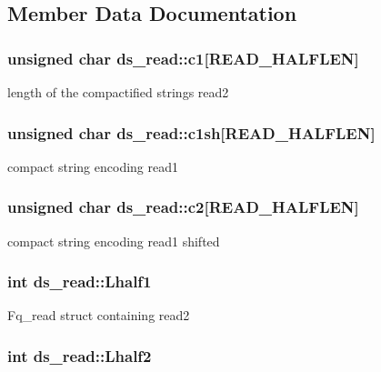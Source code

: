 \subsection{Member Data Documentation}
\hypertarget{structds__read_a0dfe9d61d741a11022ac55594788f1e6}{
\subsubsection[{c1}]{\setlength{\rightskip}{0pt plus 5cm}unsigned char ds\+\_\+read\+::c1\mbox{[}R\+E\+A\+D\+\_\+\+H\+A\+L\+F\+L\+E\+N\mbox{]}}}\label{structds__read_a0dfe9d61d741a11022ac55594788f1e6}
length of the compactified strings read2 \hypertarget{structds__read_a6e987171fc2d16d2c8de251cbf8e774f}{
\subsubsection[{c1sh}]{\setlength{\rightskip}{0pt plus 5cm}unsigned char ds\+\_\+read\+::c1sh\mbox{[}R\+E\+A\+D\+\_\+\+H\+A\+L\+F\+L\+E\+N\mbox{]}}}\label{structds__read_a6e987171fc2d16d2c8de251cbf8e774f}
compact string encoding read1 \hypertarget{structds__read_af26e72b90f742f48a920c32e53be3554}{
\subsubsection[{c2}]{\setlength{\rightskip}{0pt plus 5cm}unsigned char ds\+\_\+read\+::c2\mbox{[}R\+E\+A\+D\+\_\+\+H\+A\+L\+F\+L\+E\+N\mbox{]}}}\label{structds__read_af26e72b90f742f48a920c32e53be3554}
compact string encoding read1 shifted \hypertarget{structds__read_a93576491e7577cf93d7833314182b08b}{
\subsubsection[{Lhalf1}]{\setlength{\rightskip}{0pt plus 5cm}int ds\+\_\+read\+::\+Lhalf1}}\label{structds__read_a93576491e7577cf93d7833314182b08b}
Fq\+\_\+read struct containing read2 \hypertarget{structds__read_ad6e4b185f2aa4bb5b020bad4d93cab92}{
\subsubsection[{Lhalf2}]{\setlength{\rightskip}{0pt plus 5cm}int ds\+\_\+read\+::\+Lhalf2}}\label{structds__read_ad6e4b185f2aa4bb5b020bad4d93cab92}
